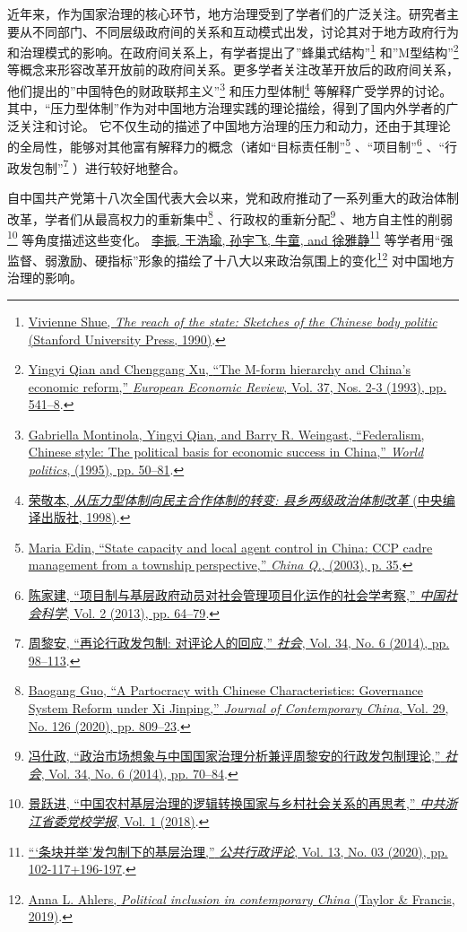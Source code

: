 \documentclass[
  12pt,
]{ctexart}
\begin{document}
近年来，作为国家治理的核心环节，地方治理受到了学者们的广泛关注。研究者主要从不同部门、不同层级政府间的关系和互动模式出发，讨论其对于地方政府行为和治理模式的影响。在政府间关系上，有学者提出了''蜂巢式结构''\footnote{\protect\hyperlink{ref-Shue1990}{Vivienne Shue, \emph{The reach of the state: Sketches of the {Chinese} body politic} ({Stanford University Press}, 1990)}.} 和''M型结构''\footnote{\protect\hyperlink{ref-QianXu1993}{Yingyi Qian and Chenggang Xu, {``The {M}-form hierarchy and {China}'s economic reform,''} \emph{European Economic Review}, Vol. 37, Nos. 2-3 (1993), pp. 541--8}.} 等概念来形容改革开放前的政府间关系。更多学者关注改革开放后的政府间关系，他们提出的''中国特色的财政联邦主义''\footnote{\protect\hyperlink{ref-MontinolaEtAl1995}{Gabriella Montinola, Yingyi Qian, and Barry R. Weingast, {``Federalism, {Chinese} style: The political basis for economic success in {China},''} \emph{World politics}, (1995), pp. 50--81}.} 和压力型体制\footnote{\protect\hyperlink{ref-RongJingBen1998}{荣敬本, \emph{从压力型体制向民主合作体制的转变: 县乡两级政治体制改革} ({中央编译出版社}, 1998)}.} 等解释广受学界的讨论。其中，``压力型体制''作为对中国地方治理实践的理论描绘，得到了国内外学者的广泛关注和讨论。 它不仅生动的描述了中国地方治理的压力和动力，还由于其理论的全局性，能够对其他富有解释力的概念（诸如``目标责任制''\footnote{\protect\hyperlink{ref-Edin2003}{Maria Edin, {``State capacity and local agent control in {China}: {CCP} cadre management from a township perspective,''} \emph{China Q.}, (2003), p. 35}.} 、``项目制''\footnote{\protect\hyperlink{ref-ChenJiaJian2013}{陈家建, {``项目制与基层政府动员\textemdash\textemdash 对社会管理项目化运作的社会学考察,''} \emph{中国社会科学}, Vol. 2 (2013), pp. 64--79}.} 、``行政发包制''\footnote{\protect\hyperlink{ref-ZhouLiAn2014}{周黎安, {``再论行政发包制: 对评论人的回应,''} \emph{社会}, Vol. 34, No. 6 (2014), pp. 98--113}.} ）进行较好地整合。

自中国共产党第十八次全国代表大会以来，党和政府推动了一系列重大的政治体制改革，学者们从最高权力的重新集中\footnote{\protect\hyperlink{ref-Guo2020}{Baogang Guo, {``A {Partocracy} with {Chinese Characteristics}: Governance {System Reform} under {Xi Jinping},''} \emph{Journal of Contemporary China}, Vol. 29, No. 126 (2020), pp. 809--23}.} 、行政权的重新分配\footnote{\protect\hyperlink{ref-FengShiZheng2014}{冯仕政, {``政治市场想象与中国国家治理分析\textemdash\textemdash 兼评周黎安的行政发包制理论,''} \emph{社会}, Vol. 34, No. 6 (2014), pp. 70--84}.} 、地方自主性的削弱\footnote{\protect\hyperlink{ref-JingYueJin2018}{景跃进, {``中国农村基层治理的逻辑转换\textemdash\textemdash 国家与乡村社会关系的再思考,''} \emph{中共浙江省委党校学报}, Vol. 1 (2018)}.} 等角度描述这些变化。 \protect\hyperlink{ref-LiZhenEtAl2020}{李振, 王浩瑜, 孙宇飞, 牛童, and 徐雅静}\footnote{\protect\hyperlink{ref-LiZhenEtAl2020}{{``{`条块并举'}发包制下的基层治理\textemdash{},''} \emph{公共行政评论}, Vol. 13, No. 03 (2020), pp. 102-117+196-197}.} 等学者用``强监督、弱激励、硬指标''形象的描绘了十八大以来政治氛围上的变化\footnote{\protect\hyperlink{ref-Ahlers2019}{Anna L. Ahlers, \emph{Political inclusion in contemporary {China}} ({Taylor \& Francis}, 2019)}.} 对中国地方治理的影响。
\end{document}
